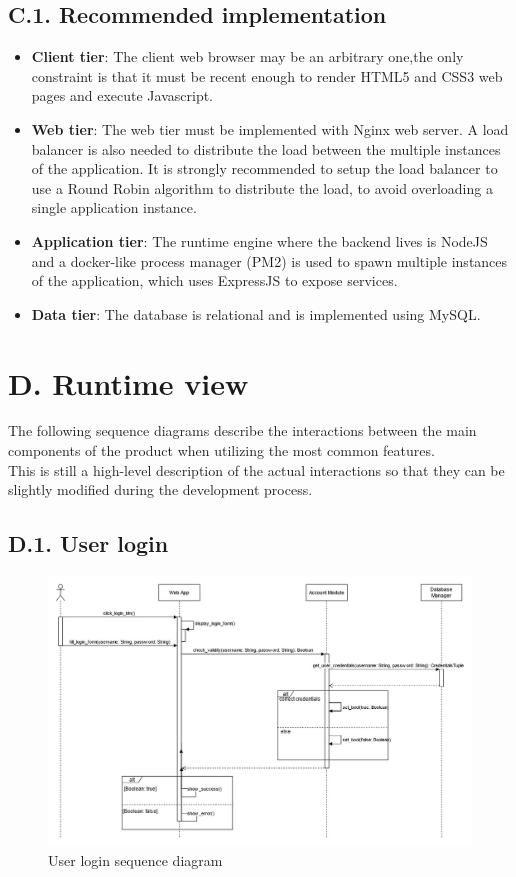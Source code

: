 \subsection{C.1. Recommended implementation}

\begin{itemize}
\item
    \textbf{Client tier}: The client web browser may be an arbitrary one,the only constraint is that it must be recent enough to render HTML5 and CSS3 web pages and execute Javascript.
\item
    \textbf{Web tier}: The web tier must be implemented with Nginx web server. A load balancer is also needed to distribute the load between the multiple instances of the application. It is strongly recommended to setup the load balancer to use a Round Robin algorithm to distribute the load, to avoid overloading a single application instance.
\item
    \textbf{Application tier}: The runtime engine where the backend lives is NodeJS and a docker-like process manager (PM2) is used to spawn multiple instances of the application, which uses ExpressJS to expose services.
\item
    \textbf{Data tier}: The database is relational and is implemented using MySQL.
\end{itemize}

\section{D. Runtime view}

The following sequence diagrams describe the interactions between the main components of the product when utilizing the most common features.\\
This is still a high-level description of the actual interactions so that they can be slightly modified during the development process.

\subsection{D.1. User login}

\begin{figure}[H]
\centering
\includegraphics{sequence_diagrams/user_login_sequence_diagram}
\caption{User login sequence diagram}
\end{figure}

